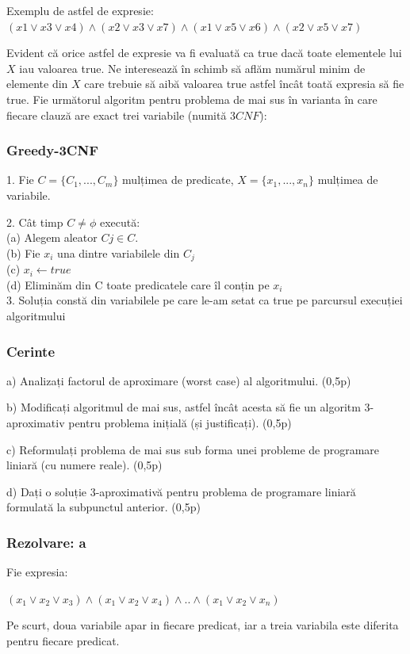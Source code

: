 \documentclass[a4paper]{article}
\begin{document}
Exemplu de astfel de expresie:
$(x1 \vee x3 \vee x4) \wedge (x2 \vee x3 \vee x7) \wedge (x1 \vee x5 \vee x6) \wedge (x2 \vee x5 \vee x7)$

Evident că orice astfel de expresie va fi evaluată ca true dacă toate
elementele lui $X$ iau valoarea true. Ne interesează în schimb să aflăm
numărul minim de elemente din $X$ care trebuie să aibă valoarea true
astfel încât toată expresia să fie true.
Fie următorul algoritm pentru problema de mai sus în varianta în
care fiecare clauză are exact trei variabile (numită $3CNF$):

\subsubsection*{Greedy-3CNF}
\begin{flushleft}


1. Fie $C = \{ C_{1}, ... , C_{m} \}$ mulțimea de predicate, $X = \{ x_{1}, ... , x_{n} \}$
mulțimea de variabile.


2. Cât timp $C \neq \phi$ execută:\\
(a) Alegem aleator $Cj \in C$.\\
(b) Fie $x_{i}$ una dintre variabilele din $C_{j}$\\
(c) $x_{i} \leftarrow true$\\
(d) Eliminăm din C toate predicatele care îl conțin pe $x_{i}$\\


3. Soluția constă din variabilele pe care le-am setat ca true pe parcursul execuției algoritmului


\subsubsection*{Cerinte}
a) Analizați factorul de aproximare (worst case) al algoritmului. \hfill (0,5p)

b) Modificați algoritmul de mai sus, astfel încât acesta să fie un algoritm 3-aproximativ pentru problema inițială (și justificați). \hfill (0,5p)

c) Reformulați problema de mai sus sub forma unei probleme de programare liniară (cu numere reale). \hfill (0,5p)

d) Dați o soluție 3-aproximativă pentru problema de programare liniară formulată la subpunctul anterior. \hfill (0,5p)

\subsubsection*{Rezolvare: a}
Fie expresia:
\begin{center}
$(x_{1} \vee x_{2} \vee x_{3}) \wedge (x_{1} \vee x_{2} \vee x_{4}) \wedge .. \wedge (x_{1} \vee x_{2} \vee x_{n})$
\end{center}
Pe scurt, doua variabile apar in fiecare predicat, iar a treia variabila este diferita pentru fiecare predicat.


\end{flushleft}
\end{document}
